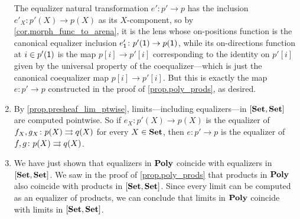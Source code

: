 \documentclass[Book-Poly]{subfiles}
\begin{document}
\begin{exercise}
\begin{solution}
\begin{enumerate}
    The equalizer natural transformation $e'\colon p'\to p$ has the inclusion $e'_X\colon p'(X)\to p(X)$ as its $X$-component, so by \cref{cor.morph_func_to_arena}, it is the lens whose on-positions function is the canonical equalizer inclusion $e'_{\textsf{1}}\colon p'(\textsf{1})\to p(\textsf{1})$, while its on-directions function at $i\in p'(\textsf{1})$ is the map $p[i]\to p'[i]$ corresponding to the identity on $p'[i]$ given by the universal property of the coequalizer---which is just the canonical coequalizer map $p[i]\to p'[i]$.
    But this is exactly the map $e\colon p'\to p$ constructed in the proof of \cref{prop.poly_prods}, as desired.
    \item By \cref{prop.presheaf_lim_ptwise}, limits---including equalizers---in $[\mathbf{Set},\mathbf{Set}]$ are computed pointwise.
    So if $e_X\colon p'(X)\to p(X)$ is the equalizer of $f_X,g_X\colon p(X)\rightrightarrows q(X)$ for every $X\in\mathbf{Set}$, then $e\colon p'\to p$ is the equalizer of $f,g\colon p(X)\rightrightarrows q(X)$.
    \item We have just shown that equalizers in $\mathbf{Poly}$ coincide with equalizers in $[\mathbf{Set},\mathbf{Set}]$.
    We saw in the proof of \cref{prop.poly_prods} that products in $\mathbf{Poly}$ also coincide with products in $[\mathbf{Set},\mathbf{Set}]$.
    Since every limit can be computed as an equalizer of products, we can conclude that limits in $\mathbf{Poly}$ coincide with limits in $[\mathbf{Set},\mathbf{Set}]$.
\end{enumerate}
\end{solution}
\end{exercise}
\end{document}
